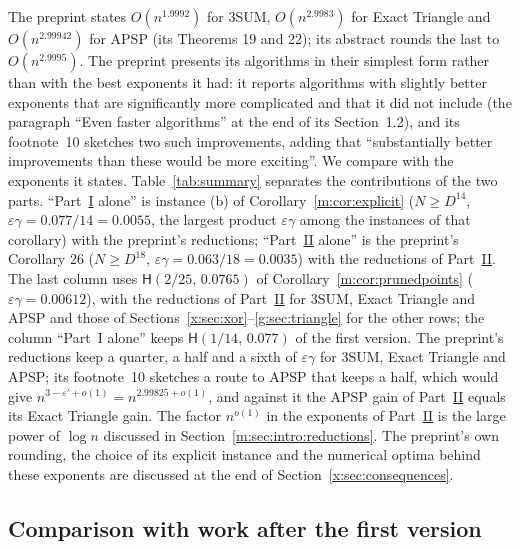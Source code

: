 \documentclass[11pt]{article}
\theoremstyle{definition}
\theoremstyle{remark}
\newcommand{\Hyp}{\mathsf{H}}
\newcommand{\EpsGammaBest}{0.00612}%
\newcommand{\HypPrunedEps}{2/25}%
\newcommand{\HypPrunedGamma}{0.0765}%
\begin{document}
The preprint states $O(n^{1.9992})$ for 3SUM, $O(n^{2.9983})$ for Exact Triangle and $O(n^{2.99942})$ for APSP (its Theorems 19 and 22); its abstract rounds the last to $O(n^{2.9995})$. The preprint presents its algorithms in their simplest form rather than with the best exponents it had: it reports algorithms with slightly better exponents that are significantly more complicated and that it did not include (the paragraph ``Even faster algorithms'' at the end of its Section~1.2), and its footnote~10 sketches two such improvements, adding that ``substantially better improvements than these would be more exciting''. We compare with the exponents it states. Table~\ref{tab:summary} separates the contributions of the two parts. ``Part~\hyperref[m:partI]{I} alone'' is instance (b) of Corollary~\ref{m:cor:explicit} ($N\ge D^{14}$, $\varepsilon\gamma=0.077/14=0.0055$, the largest product $\varepsilon\gamma$ among the instances of that corollary) with the preprint's reductions; ``Part~\hyperref[m:partII]{II} alone'' is the preprint's Corollary 26 ($N\ge D^{18}$, $\varepsilon\gamma=0.063/18=0.0035$) with the reductions of Part~\hyperref[m:partII]{II}. The last column uses $\Hyp(\HypPrunedEps,\,\HypPrunedGamma)$ of Corollary~\ref{m:cor:prunedpoints} ($\varepsilon\gamma=\EpsGammaBest$), with the reductions of Part~\hyperref[m:partII]{II} for 3SUM, Exact Triangle and APSP and those of Sections~\ref{x:sec:xor}--\ref{g:sec:triangle} for the other rows; the column ``Part~I alone'' keeps $\Hyp(1/14,\,0.077)$ of the first version. The preprint's reductions keep a quarter, a half and a sixth of $\varepsilon\gamma$ for 3SUM, Exact Triangle and APSP; its footnote~10 sketches a route to APSP that keeps a half, which would give $n^{3-\varepsilon'+o(1)}=n^{2.99825+o(1)}$, and against it the APSP gain of Part~\hyperref[m:partII]{II} equals its Exact Triangle gain. The factor $n^{o(1)}$ in the exponents of Part~\hyperref[m:partII]{II} is the large power of $\log n$ discussed in Section~\ref{m:sec:intro:reductions}. The preprint's own rounding, the choice of its explicit instance and the numerical optima behind these exponents are discussed at the end of Section~\ref{x:sec:consequences}.

\subsection{Comparison with work after the first version}\label{m:sec:intro:compare}
\end{document}
